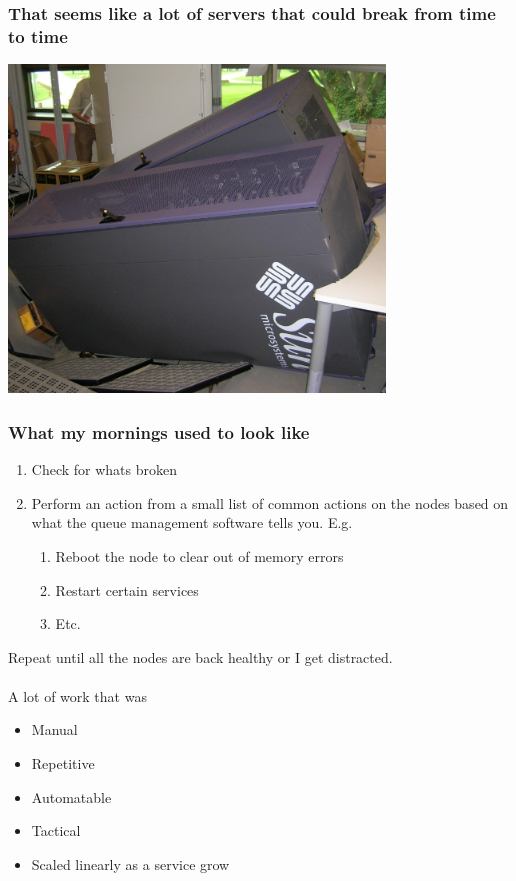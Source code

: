\documentclass{beamer}
\begin{document}
\begin{frame}
\frametitle{That seems like a lot of servers that could break from time to time}
\begin{center}
	\includegraphics[width=0.75\textwidth]{imgs/fallen_rack.jpg}
\end{center}
\end{frame}

\begin{frame}
\frametitle{What my mornings used to look like}
\begin{enumerate}
	\item Check for whats broken
	\item Perform an action from a small list of common actions on the nodes based on what the queue management software tells you. E.g.
	\begin{enumerate}
		\item Reboot the node to clear out of memory errors
		\item Restart certain services
		\item Etc.
	\end{enumerate}
\end{enumerate}
Repeat until all the nodes are back healthy or I get distracted.\\~\\
A lot of work that was
\begin{itemize}
	\item Manual
	\item Repetitive
	\item Automatable
	\item Tactical
	\item Scaled linearly as a service grow
\end{itemize}
\end{frame}
\end{document}
